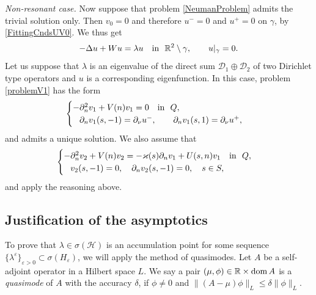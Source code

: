 \documentclass[reqno]{amsart}
\theoremstyle{plain}
\numberwithin{equation}{section}
\newcommand{\dom}{\mathop{\rm dom}}
\renewcommand{\kappa}{\varkappa}
\newcommand{\Real}{\mathbb R}
\newcommand{\eps}{\varepsilon}
\newcommand{\cH}{\mathcal{H}}
\renewcommand{\leq}{\leqslant}
\newcommand{\pte}{\partial_n}
\begin{document}
\textit{Non-resonant case.}
Now suppose that problem \eqref{NeumanProblem} admits the trivial solution only.  Then $v_0=0$ and therefore $u^-=0$ and $u^+=0$ on $\gamma$, by \eqref{FittingCndsUV0}. We thus get
\begin{equation*}
-\Delta u+Wu=\lambda u\quad \hbox{in \ } \Real^2\setminus \gamma,\qquad
 u|_{\gamma}=0.
\end{equation*}
Let us suppose that $\lambda$ is an eigenvalue of the direct sum
$\mathcal{D}_1\oplus\mathcal{D}_2$ of two Dirichlet type operators and $u$ is a corresponding eigenfunction.
In this case, problem \eqref{problemV1} has the form
\begin{equation}\label{problemV1Non}
\begin{cases}
    -\pte^2 v_1+V(n)v_1=0\quad \hbox{in \ } Q, \\
    \phantom{-}\partial_n v_1(s, -1)=\partial_\nu u^-, \qquad
\partial_n v_1(s, 1)=\partial_\nu u^+,
\end{cases}
\end{equation}
and admits a unique solution. We also assume that
\begin{equation*}
\begin{cases}
-\pte^2 v_2+V(n)v_2=-\kappa(s)\pte v_1 +U(s,n) v_1
  \quad \hbox{in \ } Q,
\\
   \phantom{-} v_2(s, -1)=0,
 \quad
 \partial_n v_2(s, -1)=0, \quad s\in S,
\end{cases}
\end{equation*}
and apply the reasoning above.




\subsection{Justification of the asymptotics}
To prove that $\lambda\in \sigma(\cH)$ is an accumulation point for some sequence $\{\lambda^\eps\}_{\eps>0}\subset \sigma(H_\eps)$, we will apply the method of quasimodes.
Let $A$ be a self-adjoint operator in a Hilbert space $L$.
We say a pair $(\mu, \phi)\in \Real\times \dom A$ is a \textit{quasimode} of  $A$ with the accuracy $\delta$, if $\phi\neq 0$  and
$\|(A-\mu)\phi\|_L\leq\delta\|\phi\|_L$.
\end{document}
